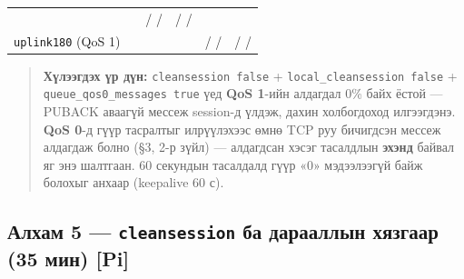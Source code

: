 \begin{longtable}[]{@{}llllll@{}}
\begin{minipage}[t]{0.14\columnwidth}
\strut
\end{minipage} & \begin{minipage}[t]{0.14\columnwidth}\raggedright
\strut
\end{minipage} & \begin{minipage}[t]{0.14\columnwidth}\raggedright
/ /\strut
\end{minipage} & \begin{minipage}[t]{0.14\columnwidth}\raggedright
/ /\strut
\end{minipage}\tabularnewline
\begin{minipage}[t]{0.14\columnwidth}\raggedright
\texttt{uplink180} (QoS 1)\strut
\end{minipage} & \begin{minipage}[t]{0.14\columnwidth}\raggedright
\strut
\end{minipage} & \begin{minipage}[t]{0.14\columnwidth}\raggedright
\strut
\end{minipage} & \begin{minipage}[t]{0.14\columnwidth}\raggedright
\strut
\end{minipage} & \begin{minipage}[t]{0.14\columnwidth}\raggedright
/ /\strut
\end{minipage} & \begin{minipage}[t]{0.14\columnwidth}\raggedright
/ /\strut
\end{minipage}\tabularnewline
\bottomrule
\end{longtable}\endgroup

\begin{quote}
\textbf{Хүлээгдэх үр дүн:} \texttt{cleansession\ false} + \texttt{local\_\allowbreak{}cleansession\ false} + \texttt{queue\_\allowbreak{}qos0\_\allowbreak{}messages\ true} үед \textbf{QoS 1}-ийн алдагдал 0\% байх ёстой --- PUBACK аваагүй мессеж session-д үлдэж, дахин холбогдоход илгээгдэнэ. \textbf{QoS 0}-д гүүр тасралтыг илрүүлэхээс өмнө TCP руу бичигдсэн мессеж алдагдаж болно (§3, 2-р зүйл) --- алдагдсан хэсэг тасалдлын \textbf{эхэнд} байвал яг энэ шалтгаан. 60 секундын тасалдалд гүүр «0» мэдээлээгүй байж болохыг анхаар (keepalive 60 с).
\end{quote}

\hypertarget{ux430ux43bux445ux430ux43c-5-cleansession-ux431ux430-ux434ux430ux440ux430ux430ux43bux43bux44bux43d-ux445ux44fux437ux433ux430ux430ux440-35-ux43cux438ux43d-pi}{%
\subsection{\texorpdfstring{Алхам 5 --- \texttt{cleansession} ба дарааллын хязгаар (35 мин) {[}Pi{]}}{Алхам 5 --- cleansession ба дарааллын хязгаар (35 мин) {[}Pi{]}}}\label{ux430ux43bux445ux430ux43c-5-cleansession-ux431ux430-ux434ux430ux440ux430ux430ux43bux43bux44bux43d-ux445ux44fux437ux433ux430ux430ux440-35-ux43cux438ux43d-pi}}

